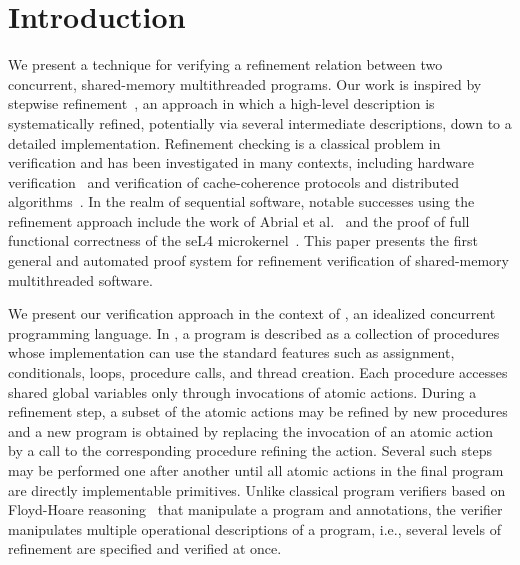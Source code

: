 \section{Introduction}
\label{sec:introduction}

We present a technique for verifying a refinement relation between two concurrent, shared-memory multithreaded programs. 
Our work is inspired by stepwise refinement~\cite{Wirth1971}, an approach in which a high-level description is systematically refined, 
potentially via several intermediate descriptions, down to a detailed implementation. 
Refinement checking is a classical problem in verification and has been investigated in many contexts, 
including hardware verification~\cite{Eiriksson2000} and verification of cache-coherence protocols and distributed algorithms~\cite{Lamport2004}.
In the realm of sequential software, notable successes using the refinement approach include the work of Abrial et al.~\cite{AbrialBHHMV10} 
and the proof of full functional correctness of the seL4 microkernel~\cite{KleinAEMSKH14}. 
This paper presents the first general and automated proof system for refinement verification of shared-memory multithreaded software. 

We present our verification approach in the context of \civl, an idealized concurrent programming language.
In \civl, a program is described as a collection of procedures whose implementation 
can use the standard features such as assignment, conditionals, loops, procedure calls, and thread creation. 
Each procedure accesses shared global variables only through invocations of atomic actions.
During a refinement step, a subset of the atomic actions may be refined by new procedures and a new program is 
obtained by replacing the invocation of an atomic action by a call to the corresponding procedure refining the action.
Several such steps may be performed one after another until all atomic actions in the final program are directly implementable primitives.
Unlike classical program verifiers based on Floyd-Hoare reasoning~\cite{Floyd67,Hoare69} that manipulate a program and annotations, 
the \civl verifier manipulates multiple operational descriptions of a program, i.e., several levels of refinement are specified and verified at once. 

